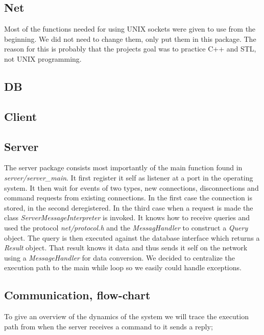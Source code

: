 \documentclass[10pt, a4paper]{article}
\begin{document}
\subsection{Net}
Most of the functions needed for using UNIX sockets were given to use from the beginning. We did not need to change them, only put them in this package. The reason for this is probably that the projects goal was to practice C++ and STL, not UNIX programming.

\subsection{DB}
\subsection{Client}
\subsection{Server}
The server package consists most importantly of the main function found in \emph{server/server\_main}. It first register it self as listener at a port in the operating system. It then wait for events of two types, new connections, disconnections and command requests from existing connections. In the first case the connection is stored, in the second deregistered. In the third case when a request is made the class \emph{ServerMessageInterpreter} is invoked. It knows how to receive queries and used the protocol \emph{net/protocol.h} and the \emph{MessagHandler} to construct a \emph{Query} object. The query is then executed against the database interface which returns a \emph{Result} object. That result knows it data and thus sends it self on the network using a \emph{MessageHandler} for data conversion. We decided to centralize the execution path to the main while loop so we easily could handle exceptions.

\subsection{Communication, flow-chart}
To give an overview of the dynamics of the system we will trace the execution path from when the server receives a command to it sends a reply;
\end{document}
